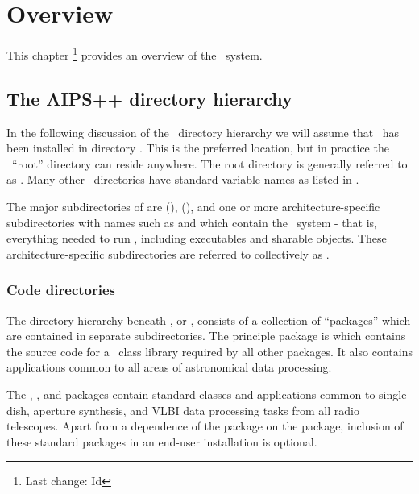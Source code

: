 \chapter{Overview}
\label{Overview}

This chapter \footnote{Last change:
$ $Id$ $}
provides an overview of the \aipspp\ system.


\section{The AIPS++ directory hierarchy}
\label{Directories}

In the following discussion of the \aipspp\ directory hierarchy we will
assume that \aipspp\ has been installed in directory .  This
is the preferred location, but in practice the \aipspp\ ``root'' directory
can reside anywhere.  The root directory is generally referred to as
.  Many other \aipspp\ directories have standard variable
names as listed in .

The major subdirectories of  are  (),
 (), and one or more architecture-specific
subdirectories with names such as  and 
which contain the \aipspp\ system - that is, everything needed to run \aipspp,
including executables and sharable objects.  These architecture-specific
subdirectories are referred to collectively as .



\subsection{Code directories}
\label{Code directories}

The directory hierarchy beneath , or ,
consists of a collection of ``packages'' which are contained in separate
subdirectories.  The principle package is  which
contains the source code for a \cplusplus\ class library required by all other
packages.  It also contains applications common to all areas of astronomical
data processing.

The , , and  packages contain standard
classes and applications common to single dish, aperture synthesis, and VLBI
data processing tasks from all radio telescopes.  Apart from a dependence of
the  package on the  package, inclusion of these
standard packages in an end-user installation is optional.

